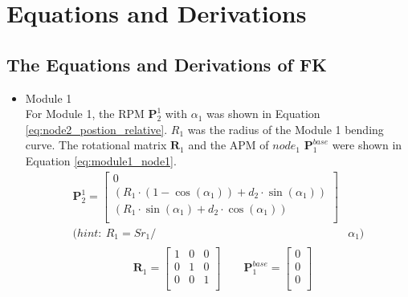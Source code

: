 \chapter{Equations and Derivations}
\label{append:equations}
\section*{The Equations and Derivations of FK}
\label{sec:FK}
\begin{itemize}
    \item Module 1 \\
    For Module 1, the RPM $\textbf{P}_{2}^{1}$ with $\alpha_1$ was shown 
    in Equation \ref{eq:node2_postion_relative}. $R_1$ was the radius of the Module 1 bending curve. The rotational 
    matrix $\textbf{R}_{1}$ and the APM of $node_1$ $\textbf{P}_{1}^{base}$ were shown in Equation \ref*{eq:module1_node1}.
    \vspace{-5mm}
    \begin{align}
        \textbf{P}_{2}^{1} = 
        \begin{bmatrix}
            0 \\
            (R_1\cdot(1-\cos(\alpha_1)) + d_2\cdot \sin(\alpha_1)) \\
            (R_1\cdot \sin(\alpha_1) + d_2\cdot \cos(\alpha_1)) \\
        \end{bmatrix}&
        \label{eq:node2_postion_relative} \\
        \nonumber (hint: \ R_1 = {Sr}_1/ &\alpha_1)
    \end{align}
    \vspace{-15mm}
    \begin{align}
        &\begin{aligned}
            \textbf{R}_{1} = 
            \begin{bmatrix}
                1 & 0 & 0 \\
                0 & 1 & 0 \\
                0 & 0 & 1 \\
            \end{bmatrix}
            \qquad
            \textbf{P}_{1}^{base} = 
            \begin{bmatrix}
                0 \\ 0 \\ 0\\
            \end{bmatrix}
        \end{aligned}

\end{align}
\end{itemize}
